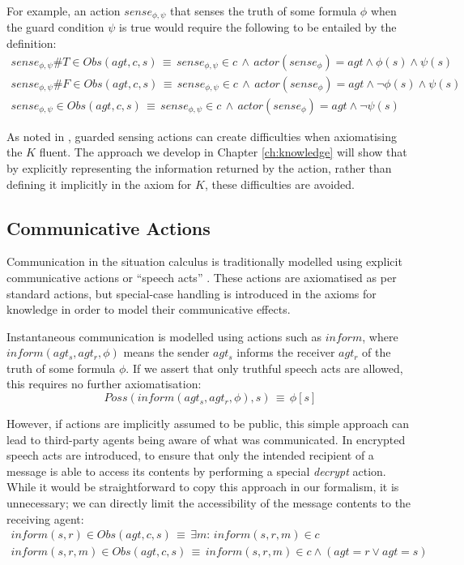For example, an action $sense_{\phi,\psi}$ that senses the truth
of some formula $\phi$ when the guard condition $\psi$ is true would
require the following to be entailed by the definition:\begin{gather*}
sense_{\phi,\psi}\#T\in Obs(agt,c,s)\,\equiv\, sense_{\phi,\psi}\in c\,\wedge\, actor(sense_{\phi})=agt\wedge\phi(s)\wedge\psi(s)\\
sense_{\phi,\psi}\#F\in Obs(agt,c,s)\,\equiv\, sense_{\phi,\psi}\in c\,\wedge\, actor(sense_{\phi})=agt\wedge\neg\phi(s)\wedge\psi(s)\\
sense_{\phi,\psi}\in Obs(agt,c,s)\,\equiv\, sense_{\phi,\psi}\in c\,\wedge\, actor(sense_{\phi})=agt\wedge\neg\psi(s)\end{gather*}


As noted in \citep{Petrick06thesis}, guarded sensing actions can
create difficulties when axiomatising the $K$ fluent. The approach
we develop in Chapter \ref{ch:knowledge} will show that by explicitly
representing the information returned by the action, rather than defining
it implicitly in the axiom for $K$, these difficulties are avoided.


\subsection{Communicative Actions}

Communication in the situation calculus is traditionally modelled
using explicit communicative actions or {}``speech acts'' \citep{shapiro01casl_feat_inter,shapiro07sc_goal_change}.
These actions are axiomatised as per standard actions, but special-case
handling is introduced in the axioms for knowledge in order to model
their communicative effects.

Instantaneous communication is modelled using actions such as $inform$,
where $inform(agt_{s},agt_{r},\phi)$ means the sender $agt_{s}$
informs the receiver $agt_{r}$ of the truth of some formula $\phi$.
If we assert that only truthful speech acts are allowed, this requires
no further axiomatisation:\[
Poss(inform(agt_{s},agt_{r},\phi),s)\,\equiv\,\phi[s]\]


However, if actions are implicitly assumed to be public, this simple
approach can lead to third-party agents being aware of what was communicated.
In \citep{shapiro01casl_feat_inter} encrypted speech acts are introduced,
to ensure that only the intended recipient of a message is able to
access its contents by performing a special \emph{decrypt} action.
While it would be straightforward to copy this approach in our formalism,
it is unnecessary; we can directly limit the accessibility of the
message contents to the receiving agent:\begin{gather*}
inform(s,r)\in Obs(agt,c,s)\,\equiv\,\exists m:\, inform(s,r,m)\in c\\
inform(s,r,m)\in Obs(agt,c,s)\,\equiv\, inform(s,r,m)\in c\wedge\left(agt=r\vee agt=s\right)\end{gather*}


